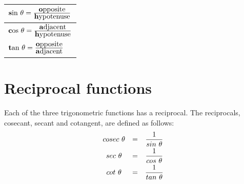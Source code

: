 \begin{table}[H]
\begin{center}

\noindent

\begin{tabular}{|l|}\hline

$\mbox{\textbf{s}in}~\theta=\frac{\mbox{\textbf{o}pposite}}{\mbox{\textbf{h}ypotenuse}} $

\\  \hline

$\mbox{\textbf{c}os}~\theta=\frac{\mbox{\textbf{a}djacent}}{\mbox{\textbf{h}ypotenuse}} $

\\ \hline

$\mbox{\textbf{t}an}~\theta=\frac{\mbox{\textbf{o}pposite}}{\mbox{\textbf{a}djacent}} $

\\   \hline
\end{tabular}
\end{center}
\end{table}

\par
\section{Reciprocal functions}
Each of the three trigonometric functions has a reciprocal. The
reciprocals, cosecant, secant and cotangent, are defined as follows:
\begin{equation*}
\begin{array}{ccc}cosec~ \theta & =& \dfrac{1}{sin~ \theta } \vspace{3pt}\\
 sec~ \theta & =& \dfrac{1}{cos~ \theta } \vspace{3pt}\\
 cot~ \theta & =& \dfrac{1}{tan~ \theta }
\end{array}
\end{equation*}

